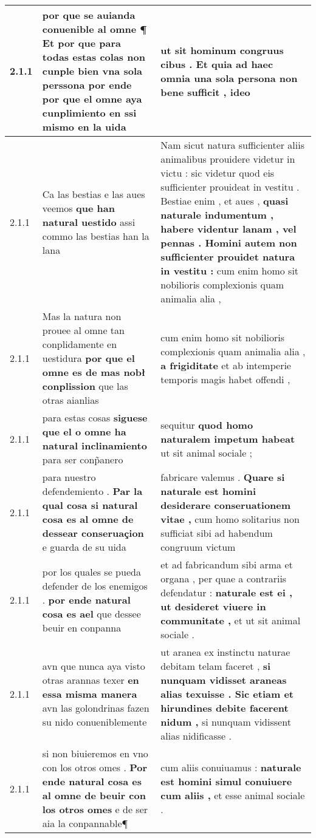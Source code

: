 \begin{tabular}{|p{1cm}|p{6.5cm}|p{6.5cm}|}
2.1.1 & por que se auianda conuenible al omne ¶ \textbf{ Et por que para todas estas colas non cunple bien vna sola perssona por ende } por que el omne aya cunplimiento en ssi mismo en la uida & ut sit hominum congruus cibus . \textbf{ Et quia ad haec omnia una sola persona non bene sufficit , } ideo \\\hline
2.1.1 & Ca las bestias e las aues veemos \textbf{ que han natural uestido } assi commo las bestias han la lana & Nam sicut natura sufficienter aliis animalibus prouidere videtur in victu : sic videtur quod eis sufficienter prouideat in vestitu . Bestiae enim , et aues , \textbf{ quasi naturale indumentum , habere videntur lanam , vel pennas . Homini autem non sufficienter prouidet natura in vestitu : } cum enim homo sit nobilioris complexionis quam animalia alia , \\\hline
2.1.1 & Mas la natura non prouee al omne tan conplidamente en uestidura \textbf{ por que el omne es de mas nobł conplission } que las otras aianlias & cum enim homo sit nobilioris complexionis quam animalia alia , \textbf{ a frigiditate } et ab intemperie temporis magis habet offendi , \\\hline
2.1.1 & para estas cosas \textbf{ siguese que el o omne ha natural inclinamiento } para ser conp̃anero & sequitur \textbf{ quod homo naturalem impetum habeat } ut sit animal sociale ; \\\hline
2.1.1 & para nuestro defendemiento . \textbf{ Par la qual cosa si natural cosa es al omne de dessear conseruaçion } e guarda de su uida & fabricare valemus . \textbf{ Quare si naturale est homini desiderare conseruationem vitae , } cum homo solitarius non sufficiat sibi ad habendum congruum victum \\\hline
2.1.1 & por los quales se pueda defender de los enemigos . \textbf{ por ende natural cosa es ael } que dessee beuir en conpanna & et ad fabricandum sibi arma et organa , per quae a contrariis defendatur : \textbf{ naturale est ei , ut desideret viuere in communitate , } et ut sit animal sociale . \\\hline
2.1.1 & avn que nunca aya visto otras arannas texer \textbf{ en essa misma manera } avn las golondrinas fazen su nido conueniblemente & ut aranea ex instinctu naturae debitam telam faceret , \textbf{ si nunquam vidisset araneas alias texuisse . Sic etiam et hirundines debite facerent nidum , } si nunquam vidissent alias nidificasse . \\\hline
2.1.1 & si non biuieremos en vno con los otros omes . \textbf{ Por ende natural cosa es al omne de beuir con los otros omes } e de ser aia la conpannable¶ & cum aliis conuiuamus : \textbf{ naturale est homini simul conuiuere cum aliis , } et esse animal sociale . \\\hline

\end{tabular}
